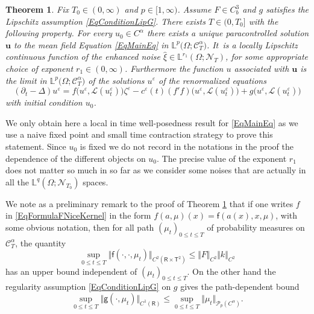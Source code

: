 \documentclass[10pt]{amsart}
\newtheorem{thm}{Theorem}
\theoremstyle{definition}
\let\epsilon\varepsilon
\let\eps\epsilon
\newcommand\bbR{\mathbf{\mathsf{R}}}
\newcommand{\mcL}{\mathcal{L}}
\newcommand{\mcN}{\mathcal{N}}
\newcommand{\mcP}{\mathcal{P}}
\newcommand{\bbL}{\mathbb{L}}
\newcommand{\bsu}{\boldsymbol{u}}
\newcommand{\scrC}{\ensuremath{\mathscr{C}}}
\begin{document}
\begin{thm} \label{ThmLongRange2ptfixe}
Fix $T_0\in(0,\infty)$ and $p\in[1,\infty)$. Assume $F\in C^3_b$ and $g$ satisfies the Lipschitz assumption \eqref{EqConditionLipG}. There exists $T\in(0,T_0]$ with the following property. For every $u_0\in C^\alpha$ there exists a unique paracontrolled solution $\bsu$ to the mean field Equation \eqref{EqMainEq} in $\bbL^p(\Omega; \scrC^\alpha_{ T}\bigr)$. It~is a locally Lipschitz continuous function of the enhanced noise $\widehat\xi\in \bbL^{ r_1}(\Omega;\boldsymbol{\mcN}_T)$, for some appropriate choice of exponent $r_1\in(0,\infty)$. Furthermore the function $u$ associated with $\bsu$ is the limit in $\bbL^p\bigl(\Omega; \scrC^\alpha_{ T}\bigr)$ of the solutions $u^\eps$ of the renormalized equations
\[
(\partial_t-\Delta)u^\eps = f\bigl(u^\eps,\mcL(u^\eps_t)\bigr)\zeta^\eps - c^\eps(t) (f'f)\bigl(u^\eps,\mcL(u^\eps_t)\bigr) + g\bigl(u^\eps,\mcL(u^\eps_t)\bigr)
\]
with initial condition $u_0$.
\end{thm}

We only obtain here a local in time well-posedness result for \eqref{EqMainEq} as we use a naive fixed point and small time contraction strategy to prove this statement. Since $u_0$ is fixed we do not record in the notations in the proof the dependence of the different objects on $u_0$. The precise value of the exponent $r_1$ does not matter so much in so far as we consider some noises that are actually in all the $\bbL^q(\Omega; \boldsymbol{\mcN}_{T_0})$ spaces.

We note as a preliminary remark to the proof of Theorem \ref{ThmLongRange2ptfixe} that if one writes $f$ in \eqref{EqFormulaFNiceKernel} in the form $f(a,\mu)(x)=\mathsf{f}(a(x),x,\mu)$, with some obvious notation, then for all path $(\mu_t)_{0\leq t\leq T}$ of probability measures on $ \scrC^\alpha_T$, the quantity
\begin{equation} \label{EqMeasureUniformBoundNonlinearity}
\sup_{0\leq t\leq T} \Vert\mathsf{f}(\cdot,\cdot,\mu_t)\Vert_{C^2(\bbR\times\mathsf{T}^2)} \leq \Vert F\Vert_{C^2} \Vert k\Vert_{C^2}
\end{equation}
has an upper bound independent of $(\mu_t)_{0\leq t\leq T}$. On the other hand the regularity assumption \eqref{EqConditionLipG} on $g$ gives the path-dependent bound
\begin{equation} \label{EqBoundDriftTerm}
\sup_{0\leq t\leq T} \Vert\mathsf{g}(\cdot,\mu_t)\Vert_{C^1(\bbR)} \leq \sup_{0\leq t\leq T} \Vert \mu_t\Vert_{\mcP_p(C^\alpha)}.
\end{equation}
\end{document}
